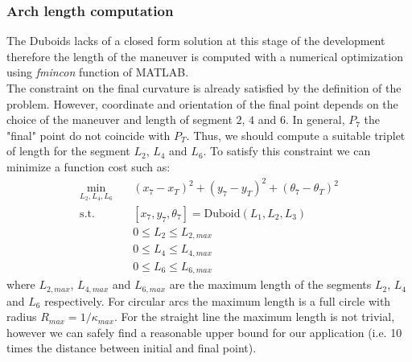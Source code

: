 \documentclass[11pt,twocolumn]{scrartcl}
\begin{document}
\subsubsection*{Arch length computation}
The Duboids lacks of a closed form solution at this stage of the development therefore the length of the maneuver is computed with a numerical optimization using \textit{fmincon} function of MATLAB.\\
The constraint on the final curvature is already satisfied by the definition of the problem. However, coordinate and orientation of the final point depends on the choice of the maneuver and length of segment $2$, $4$ and $6$.
In general, $P_7$ the "final" point do not coincide with $P_T$. Thus, we should compute a suitable triplet of length for the segment $L_2$, $L_4$ and $L_6$. To satisfy this constraint we can minimize a function cost such as:
%
\begin{equation}
  \label{eq:costfunction}
  \begin{split}
    \min_{L_2,L_4,L_6} \quad & (x_7-x_T)^2 + (y_7-y_T)^2 + (\theta_7-\theta_T)^2\\
    \text{s.t.} \quad & [x_7,y_7,\theta_7] = \mathrm{Duboid}(L_1,L_2,L_3)\\
    & 0 \leq L_2 \leq L_{2,max}\\
    & 0 \leq L_4 \leq L_{4,max}\\
    & 0 \leq L_6 \leq L_{6,max}
  \end{split}
\end{equation}
%
where $L_{2,max}$, $L_{4,max}$ and $L_{6,max}$ are the maximum length of the segments $L_2$, $L_4$ and $L_6$ respectively. For circular arcs the maximum length is a full circle with radius $R_{max}=1/\kappa_{max}$. For the straight line the maximum length is not trivial, however we can safely find a reasonable upper bound for our application (i.e. 10 times the distance between initial and final point).
%
\end{document}
